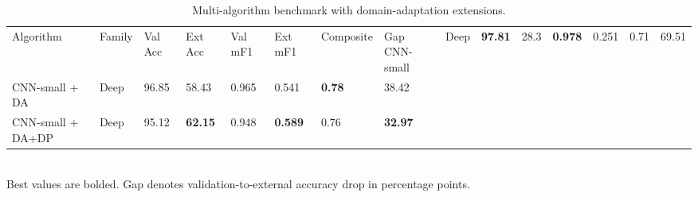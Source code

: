 \begin{table}[t]
\centering
\caption{Multi-algorithm benchmark with domain-adaptation extensions.}
\label{tab:paemdt_table4}
\small
\begin{tabular}{llllllll}
\toprule
Algorithm & Family & Val Acc & Ext Acc & Val mF1 & Ext mF1 & Composite & Gap %
\midrule
CNN-small & Deep & \textbf{97.81} & 28.3 & \textbf{0.978} & 0.251 & 0.71 & 69.51 \\
CNN-small + DA & Deep & 96.85 & 58.43 & 0.965 & 0.541 & \textbf{0.78} & 38.42 \\
CNN-small + DA+DP & Deep & 95.12 & \textbf{62.15} & 0.948 & \textbf{0.589} & 0.76 & \textbf{32.97} \\
\bottomrule
\end{tabular}
\\[2pt]\footnotesize{Best values are bolded. Gap denotes validation-to-external accuracy drop in percentage points.}
\end{table}
